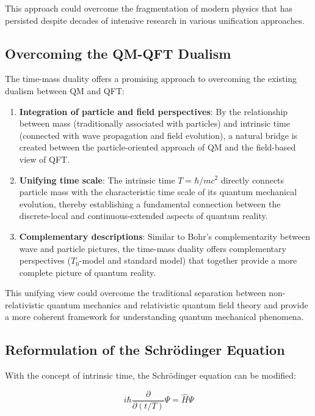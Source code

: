 \documentclass[12pt,a4paper]{article}  %
\begin{document}
	This approach could overcome the fragmentation of modern physics that has persisted despite decades of intensive research in various unification approaches.
	
	\subsection{Overcoming the QM-QFT Dualism}
	
	The time-mass duality offers a promising approach to overcoming the existing dualism between QM and QFT:
	
	\begin{enumerate}
		\item \textbf{Integration of particle and field perspectives}: By the relationship between mass (traditionally associated with particles) and intrinsic time (connected with wave propagation and field evolution), a natural bridge is created between the particle-oriented approach of QM and the field-based view of QFT.
		
		\item \textbf{Unifying time scale}: The intrinsic time $T = \hbar/mc^2$ directly connects particle mass with the characteristic time scale of its quantum mechanical evolution, thereby establishing a fundamental connection between the discrete-local and continuous-extended aspects of quantum reality.
		
		\item \textbf{Complementary descriptions}: Similar to Bohr's complementarity between wave and particle pictures, the time-mass duality offers complementary perspectives ($T_0$-model and standard model) that together provide a more complete picture of quantum reality.
	\end{enumerate}
	
	This unifying view could overcome the traditional separation between non-relativistic quantum mechanics and relativistic quantum field theory and provide a more coherent framework for understanding quantum mechanical phenomena.
	
	\subsection{Reformulation of the Schrödinger Equation}
	
	With the concept of intrinsic time, the Schrödinger equation can be modified:
	
	\begin{equation}
		i\hbar \frac{\partial}{\partial (t/T)}\Psi = \hat{H}\Psi
	\end{equation}
	
\end{document}
